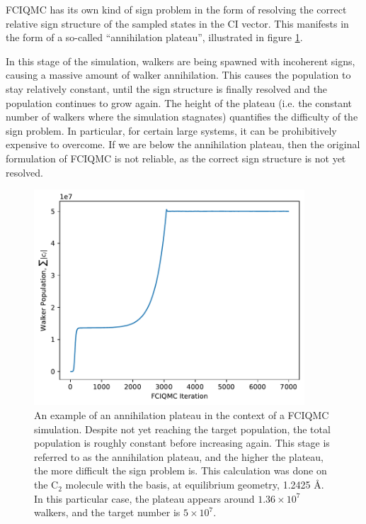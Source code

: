 \gls{FCIQMC} has its own kind of sign problem in the form of resolving the correct relative sign structure of the sampled states in the \gls{CI} vector.\supercite{spencerSignProblemPopulation2012} This manifests in the form of a so-called ``annihilation plateau'', illustrated in figure \ref{fig:annihilation_plateau}.

In this stage of the simulation, walkers are being spawned with incoherent signs, causing a massive amount of walker annihilation. This causes the population to stay relatively constant, until the sign structure is finally resolved and the population continues to grow again. The height of the plateau (i.e. the constant number of walkers where the simulation stagnates) quantifies the difficulty of the sign problem. In particular, for certain large systems, it can be prohibitively expensive to overcome. If we are below the annihilation plateau, then the original formulation of \gls{FCIQMC} is not reliable, as the correct sign structure is not yet resolved.

\begin{figure}[htbp]
    \centering
    \includegraphics[width=0.9\textwidth]{figures/qmc/c2_example_plateau.pdf}
    \caption{An example of an annihilation plateau in the context of a \gls{FCIQMC} simulation. Despite not yet reaching the target population, the total population is roughly constant before increasing again. This stage is referred to as the annihilation plateau, and the higher the plateau, the more difficult the sign problem is. This calculation was done on the C$_2$ molecule with the \vdz basis, at equilibrium geometry, 1.2425 \AA. In this particular case, the plateau appears around $1.36\times 10^7$ walkers, and the target number is $5\times 10^7$.}
    \label{fig:annihilation_plateau}
\end{figure}

